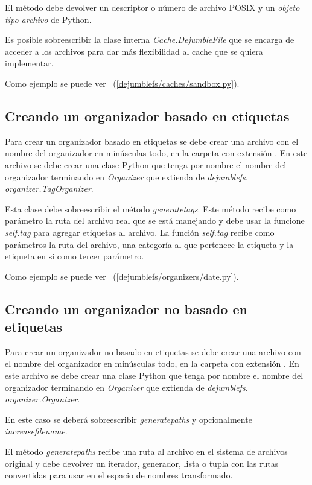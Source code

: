 El método debe devolver un descriptor o número de archivo POSIX y un \textit{objeto tipo archivo} de Python.

Es posible sobreescribir la clase interna \textit{Cache.DejumbleFile} que se encarga de acceder a los archivos para dar más flexibilidad al cache que se quiera implementar. 

Como ejemplo se puede ver ~(\ref{dejumblefs/caches/sandbox.py}).

\subsection{Creando un organizador basado en etiquetas}

Para crear un organizador basado en etiquetas se debe crear una archivo con el nombre del organizador en minúsculas todo, en la carpeta  con extensión . En este archivo se debe crear una clase Python que tenga por nombre el nombre del organizador terminando en \textit{Organizer} que extienda de \textit{dejumblefs. organizer.TagOrganizer}.

Esta clase debe sobreescribir el método \textit{generatetags}. Este método recibe como parámetro la ruta del archivo real que se está manejando y debe usar la funcione \textit{self.tag} para agregar etiquetas al archivo. La función \textit{self.tag} recibe como parámetros la ruta del archivo, una categoría al que pertenece la etiqueta y la etiqueta en si como tercer parámetro.

Como ejemplo se puede ver ~(\ref{dejumblefs/organizers/date.py}).

\subsection{Creando un organizador no basado en etiquetas}

Para crear un organizador no basado en etiquetas se debe crear una archivo con el nombre del organizador en minúsculas todo, en la carpeta  con extensión . En este archivo se debe crear una clase Python que tenga por nombre el nombre del organizador terminando en \textit{Organizer} que extienda de \textit{dejumblefs. organizer.Organizer}.

En este caso se deberá sobreescribir \textit{generatepaths} y opcionalmente \textit{increasefilename}.

El método \textit{generatepaths} recibe una ruta al archivo en el sistema de archivos original y debe devolver un iterador, generador, lista o tupla con las rutas convertidas para usar en el espacio de nombres transformado.

